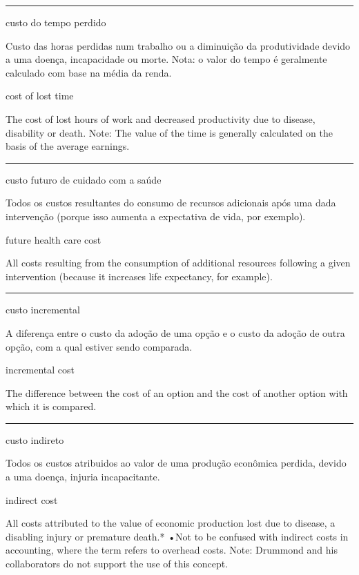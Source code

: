 \documentclass[
]{book}
\begin{document}
\begin{center}\rule{0.5\linewidth}{0.5pt}\end{center}

custo do tempo perdido

Custo das horas perdidas num trabalho ou a diminuição da produtividade devido a uma doença, incapacidade ou morte. Nota: o valor do tempo é geralmente calculado com base na média da renda.

cost of lost time

The cost of lost hours of work and decreased productivity due to disease, disability or death. Note: The value of the time is generally calculated on the basis of the average earnings.

\begin{center}\rule{0.5\linewidth}{0.5pt}\end{center}

custo futuro de cuidado com a saúde

Todos os custos resultantes do consumo de recursos adicionais após uma dada intervenção (porque isso aumenta a expectativa de vida, por exemplo).

future health care cost

All costs resulting from the consumption of additional resources following a given intervention (because it increases life expectancy, for example).

\begin{center}\rule{0.5\linewidth}{0.5pt}\end{center}

custo incremental

A diferença entre o custo da adoção de uma opção e o custo da adoção de outra opção, com a qual estiver sendo comparada.

incremental cost

The difference between the cost of an option and the cost of another option with which it is compared.

\begin{center}\rule{0.5\linewidth}{0.5pt}\end{center}

custo indireto

Todos os custos atribuidos ao valor de uma produção econômica perdida, devido a uma doença, injuria incapacitante.

indirect cost

All costs attributed to the value of economic production lost due to disease, a disabling injury or premature death.* •Not to be confused with indirect costs in accounting, where the term refers to overhead costs. Note: Drummond and his collaborators do not support the use of this concept.
\end{document}
